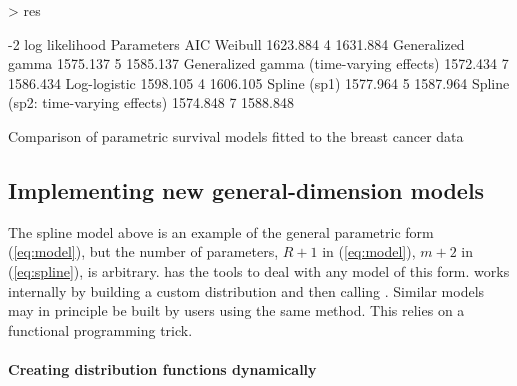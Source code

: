 \documentclass[nojss,nofooter]{jss}
\begin{document}
\begin{Schunk}
\end{Schunk}
\begin{table}[h]
\begin{Schunk}
\begin{Sinput}
> res
\end{Sinput}
\begin{Soutput}
                                         -2 log likelihood Parameters      AIC
Weibull                                           1623.884          4 1631.884
Generalized gamma                                 1575.137          5 1585.137
Generalized gamma (time-varying effects)          1572.434          7 1586.434
Log-logistic                                      1598.105          4 1606.105
Spline (sp1)                                      1577.964          5 1587.964
Spline (sp2: time-varying effects)                1574.848          7 1588.848
\end{Soutput}
\end{Schunk}
  \caption{Comparison of parametric survival models fitted to the breast cancer data}
  \label{tab:aic}
\end{table}


\subsection{Implementing new general-dimension models}
\label{sec:gdim}

The spline model above is an example of the general parametric form
(\ref{eq:model}), but the number of parameters, $R+1$ in
(\ref{eq:model}), $m+2$ in (\ref{eq:spline}), is arbitrary.
 has the tools to deal with any model of this form.
 works internally by building a custom
distribution and then calling .  Similar models may
in principle be built by users using the same method.  This relies on
a functional programming trick.

\paragraph{Creating distribution functions dynamically}
\end{document}
